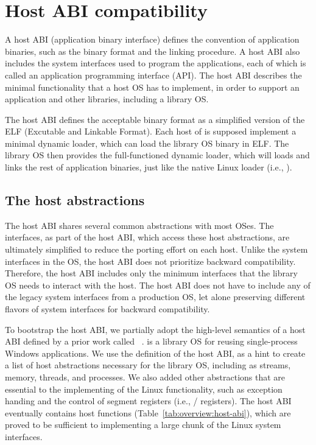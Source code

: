 \section{Host ABI compatibility}
\label{sec:overview:host}

A host ABI (application binary interface) defines the convention of application binaries, such as the binary format and the linking procedure. A host ABI also includes the system interfaces used to program the applications, each of which is called an application programming interface (API).
The host ABI describes the minimal functionality that a host OS has to implement, in order to support an application and other libraries, including a library OS.


The host ABI defines the acceptable binary format as a simplified version of the ELF (Excutable and Linkable Format).
Each host of \graphene{} is supposed implement a minimal dynamic loader,
which can load the \graphene{} library OS binary in ELF.
The library OS then provides the full-functioned dynamic loader,
which will loads and links the rest of application binaries, just like the native Linux loader (i.e., ).




\subsection{The host abstractions}
\label{sec:overview:host:abstractions}


The host ABI shares several common abstractions with most OSes. The interfaces, as part of the host ABI, which access these host abstractions, are ultimately simplified to reduce the porting effort on each host.
Unlike the system interfaces in the OS, the host ABI does not prioritize backward compatibility. Therefore, the host ABI includes only the minimum interfaces that the library OS needs to interact with the host. The host ABI does not have to include any of  the legacy system interfaces from a production OS, let alone preserving different flavors of system interfaces for backward compatibility.


To bootstrap the host ABI, we partially adopt the high-level semantics of a host ABI defined by a prior work called \drawbridge{}~\cite{porter11drawbridge}.
\drawbridge{} is a library OS for reusing single-process Windows applications.
We use the definition of the \drawbridge{} host ABI, as a hint to create a list of host abstractions necessary for the library OS, including as streams, memory, threads, and processes. We also added other abstractions that are essential to the implementing of the Linux functionality, such as exception handing and the control of segment registers (i.e., / registers).
The host ABI eventually contains \palcalls{} host functions (Table~\ref{tab:overview:host-abi}), which are proved to be sufficient to implementing a large chunk of the Linux system interfaces.


